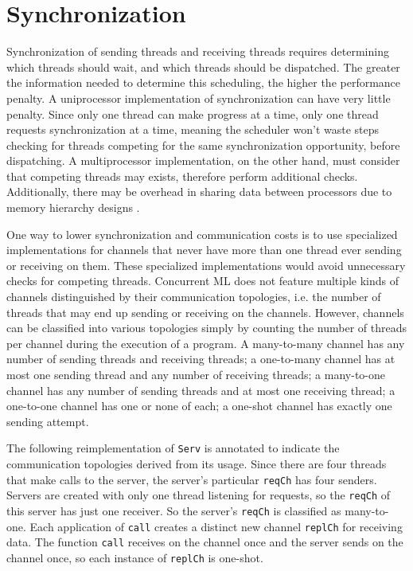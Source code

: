 \documentclass[10pt]{article}
\begin{document}
\section{Synchronization}
Synchronization of sending threads and receiving threads
requires determining which threads should wait, and which threads should be dispatched.
The greater the information needed
to determine this scheduling, the higher the performance penalty. A uniprocessor
implementation of synchronization can have very little penalty. Since only one thread can make
progress at a time, only one thread requests synchronization at a time, meaning the scheduler
won't waste steps checking for threads competing for the same synchronization opportunity,
before dispatching. A multiprocessor implementation, on the other hand, must consider that
competing threads may exists, therefore perform additional checks. Additionally, there may be 
overhead in sharing data between processors due to memory hierarchy designs \cite{}. 

One way to lower synchronization and communication costs is to use specialized implementations
for channels that never have more than one thread ever sending or receiving on them. These
specialized implementations would avoid unnecessary checks for competing threads.
Concurrent ML does not feature multiple kinds of channels distinguished by their communication
topologies, i.e. the number of threads that may end up sending or receiving on the channels.
However, channels can be classified into various topologies simply by counting the number of
threads per channel during the execution of a program.  A many-to-many channel has any number
of sending threads and receiving threads;
a one-to-many channel has at most one sending thread and
any number of receiving threads;
a many-to-one channel has any number of sending threads and at most one receiving thread;
a one-to-one channel has one or none of each;
a one-shot channel has exactly one sending attempt.

The following reimplementation of \lstinline{Serv} is annotated to indicate the communication topologies
derived from its usage. Since there are four threads that make calls to the server, the
server's particular \lstinline{reqCh} has four senders.  Servers are created with only one
thread listening for requests, so the \lstinline{reqCh} of this server has just one receiver.
So the server's \lstinline{reqCh} is classified as many-to-one.
Each application of \lstinline{call} creates a distinct
new channel \lstinline{replCh} for receiving data.  The function \lstinline{call} receives on the channel
once and the server sends on the channel once, so each instance of \lstinline{replCh} is
one-shot.
\end{document}
